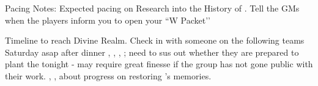 \documentclass[green]{GL2020}
\begin{document}
Pacing Notes:
Expected pacing on Research into the History of \pEarth{}.
Tell the GMs when the players inform you to open your ``W Packet’’


Timeline to reach Divine Realm. Check in with someone on the following teams Saturday asap after dinner
\cFlowPriest{}, \cCurse{}, \cAmbition{}, \cAssistantScientist{}; need to sus out whether they are prepared to plant the \iBeansMB{} tonight - may require great finesse if the group has not gone public with their work.
\cDisney{}, \cTechStar{}, \cWildCard{} about progress on restoring \cDisney{}’s memories.
\end{document}
